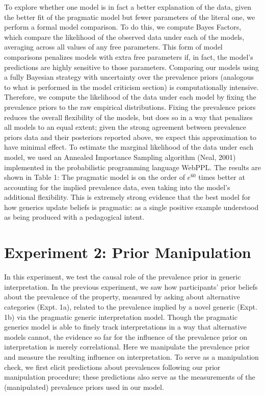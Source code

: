 \documentclass[floatsintext,doc]{apa6}
\begin{document}
To explore whether one model is in fact a better explanation of the data, given the better fit of the pragmatic model but fewer parameters of the literal one, we perform a formal model comparison.
To do this, we compute Bayes Factors, which compare the likelihood of the observed data under each of the models, averaging across all values of any free parameters.
This form of model comparisons penalizes models with extra free parameters if, in fact, the model's predictions are highly sensitive to those parameters.
Comparing our models using a fully Bayesian strategy with uncertainty over the prevalence priors (analogous to what is performed in the model criticism section) is computationally intensive.
Therefore, we compute the likelihood of the data under each model by fixing the prevalence priors to the raw empirical distributions. Fixing the prevalence priors reduces the overall flexibility of the models, but does so in a way that penalizes all models to an equal extent; given the strong agreement between prevalence priors data and their posteriors reported above, we expect this approximation to have minimal effect.
To estimate the marginal likelihood of the data under each model, we used an Annealed Importance Sampling algorithm (Neal, 2001) implemented in the probabilistic programming language WebPPL.
The results are shown in Table 1: The pragmatic model is on the order of \(e^{60}\) times better at accounting for the implied prevalence data, even taking into the model's additional flexibility.
This is extremely strong evidence that the best model for how generics update beliefs is pragmatic: as a single positive example understood as being produced with a pedagogical intent.



\hypertarget{experiment-2-prior-manipulation}{%
\section{Experiment 2: Prior Manipulation}\label{experiment-2-prior-manipulation}}

In this experiment, we test the causal role of the prevalence prior in generic interpretation.
In the previous experiment, we saw how participants' prior beliefs about the prevalence of the property, measured by asking about alternative categories (Expt. 1a), related to the prevalence implied by a novel generic (Expt. 1b) via the pragmatic generic interpretation model.
Though the pragmatic generics model is able to finely track interpretations in a way that alternative models cannot, the evidence so far for the influence of the prevalence prior on interpretation is merely correlational.
Here we manipulate the prevalence prior and measure the resulting influence on interpretation.
To serve as a manipulation check, we first elicit predictions about prevalences following our prior manipulation procedure; these predictions also serve as the measurements of the (manipulated) prevalence priors used in our model.
\end{document}
